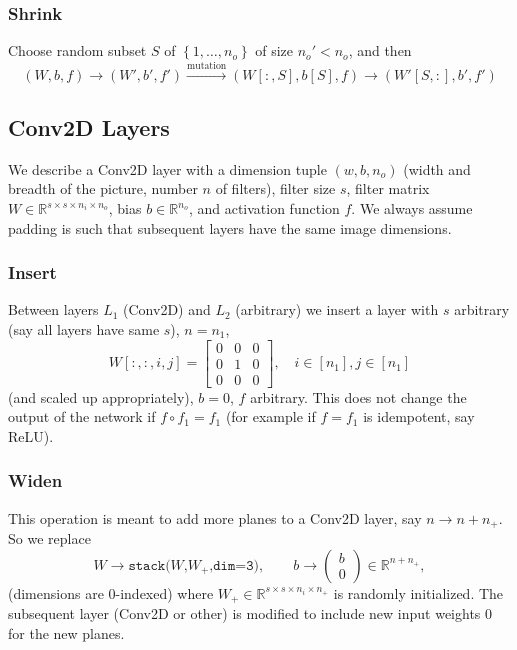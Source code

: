 \documentclass{article}
\theoremstyle{nonumberplain}
\theoremstyle{nonumberplain}
\theoremstyle{empty}
\numberwithin{equation}{section}
\newcommand{\R}{\mathbb{R}} %
\newcommand{\tendsto}[1]{\stackrel{#1}{\longrightarrow}}
\begin{document}
\subsubsection*{Shrink}
Choose random subset $S$ of $\left\{ 1, \ldots ,n_o \right\} $ of size $n_o' < n_o$, and then
\begin{equation*}
    (W,b,f) \to (W',b',f') \tendsto{\text{mutation}} (W[:,S], b[S], f) \to (W'[S,:], b', f')
\end{equation*}

\subsection{Conv2D Layers}
We describe a Conv2D layer with a dimension tuple $(w,b,n_o)$ (width and breadth of the picture, number $n$ of filters), filter size $s$, filter matrix $W \in \R ^{s\times s\times n_i \times n_o}$, bias $b\in \R ^{n_o}$, and activation function $f$. We always assume padding is such that subsequent layers have the same image dimensions.

\subsubsection*{Insert}
Between layers $L_1$ (Conv2D) and $L_2$ (arbitrary) we insert a layer with $s$ arbitrary (say all layers have same $s$), $n = n_1$, \[
    W[:,:,i,j] = \begin{bmatrix} 0 & 0 & 0\\ 0 & 1 & 0\\ 0 & 0 & 0 \end{bmatrix} ,\quad i\in [n_1],j\in[n_1]
\] (and scaled up appropriately), $b = 0$, $f$ arbitrary. This does not change the output of the network if $f \circ f_1 = f_1$ (for example if $f = f_1$ is idempotent, say ReLU).

\subsubsection*{Widen}
This operation is meant to add more planes to a Conv2D layer, say $n \to n + n_+$. So we replace  \[
    W \rightarrow \texttt{stack($W$,$W_+$,dim=3)} ,\qquad b \to \begin{pmatrix} b\\ 0 \end{pmatrix} \in \R ^{n + n_+},
\] (dimensions are $0$-indexed) where $W_+ \in \R ^{s\times s\times n_i\times n_+}$ is randomly initialized. The subsequent layer (Conv2D or other) is modified to include new input weights $0$ for the new planes.
\end{document}
